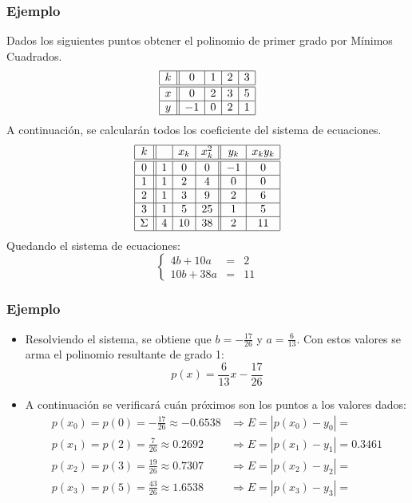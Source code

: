 \documentclass[10pt]{beamer}
\begin{document}
{
\frametitle{Ejemplo}
Dados los siguientes puntos obtener el polinomio de primer grado por M\'inimos Cuadrados.
$$
\begin{array}{|c||c|c|c|c|}\hline
k & 0 & 1 & 2 & 3\\\hline\hline
x & 0 & 2 & 3 & 5\\\hline
y & -1 & 0 & 2 & 1\\\hline
\end{array}
$$
A continuaci\'on, se calcular\'an todos los coeficiente del sistema de ecuaciones.
$$
\begin{array}{|c||c|c|c||c|c|}\hline
  k & & x_k & x_k^2 & y_k & x_ky_k\\\hline\hline
  0 & 1 & 0 & 0 & -1 & 0\\\hline
  1 & 1 & 2 & 4 & 0 & 0\\\hline
  2 & 1 & 3 & 9 & 2 & 6\\\hline
  3 & 1 & 5 & 25 & 1 & 5\\\hline
  \Sigma & 4 & 10 & 38 & 2 & 11\\\hline
\end{array}
$$
Quedando el sistema de ecuaciones:
$$
\left\{\begin{array}{rcl}  
  4b+ 10a & = & 2\\
  10b + 38a & = & 11
\end{array}\right.
$$
}
\begin{frame}
  \frametitle{Ejemplo}
  \begin{itemize}
    \item Resolviendo el sistema, se obtiene que $b = -\frac{17}{26}$ y $a = \frac{6}{13}$. Con estos valores se arma el polinomio resultante de grado 1:
  $$
  p(x) = \frac{6}{13}x - \frac{17}{26}
  $$
  \item<2->A continuación se verificará cuán próximos son los puntos a los valores dados:  
  \begin{align*}
    p(x_0) =p(0) = -\frac{17}{26} \approx -0.6538 & \Rightarrow E = |p(x_0)-y_0|=\\
    p(x_1) = p(2) = \frac{7}{26} \approx 0.2692& \Rightarrow E = |p(x_1)-y_1|=0.3461\\
    p(x_2) = p(3) = \frac{19}{26} \approx 0.7307& \Rightarrow E = |p(x_2)-y_2|=\\
    p(x_3) = p(5) = \frac{43}{26} \approx 1.6538& \Rightarrow E = |p(x_3)-y_3|=
  \end{align*}            
\end{itemize}
\end{frame}
\end{document}
